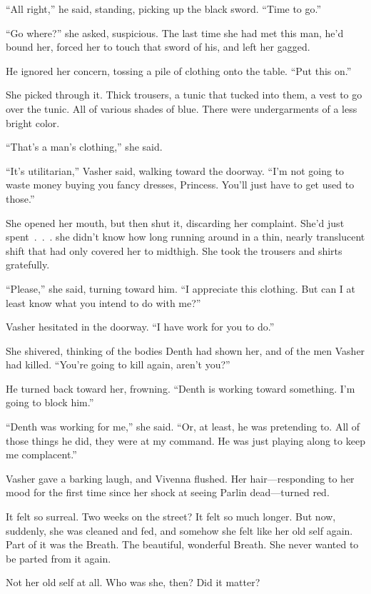 “All right,” he said, standing, picking up the black sword. “Time to go.”

“Go where?” she asked, suspicious. The last time she had met this man, he’d bound her, forced her to touch that sword of his, and left her gagged.

He ignored her concern, tossing a pile of clothing onto the table. “Put this on.”

She picked through it. Thick trousers, a tunic that tucked into them, a vest to go over the tunic. All of various shades of blue. There were undergarments of a less bright color.

“That’s a man’s clothing,” she said.

“It’s utilitarian,” Vasher said, walking toward the doorway. “I’m not going to waste money buying you fancy dresses, Princess. You’ll just have to get used to those.”

She opened her mouth, but then shut it, discarding her complaint. She’d just spent~.~.~. she didn’t know how long running around in a thin, nearly translucent shift that had only covered her to midthigh. She took the trousers and shirts gratefully.

“Please,” she said, turning toward him. “I appreciate this clothing. But can I at least know what you intend to do with me?”

Vasher hesitated in the doorway. “I have work for you to do.”

She shivered, thinking of the bodies Denth had shown her, and of the men Vasher had killed. “You’re going to kill again, aren’t you?”

He turned back toward her, frowning. “Denth is working toward something. I’m going to block him.”

“Denth was working for me,” she said. “Or, at least, he was pretending to. All of those things he did, they were at my command. He was just playing along to keep me complacent.”

Vasher gave a barking laugh, and Vivenna flushed. Her hair—responding to her mood for the first time since her shock at seeing Parlin dead—turned red.

It felt so surreal. Two weeks on the street? It felt so much longer. But now, suddenly, she was cleaned and fed, and somehow she felt like her old self again. Part of it was the Breath. The beautiful, wonderful Breath. She never wanted to be parted from it again.

Not her old self at all. Who was she, then? Did it matter?

